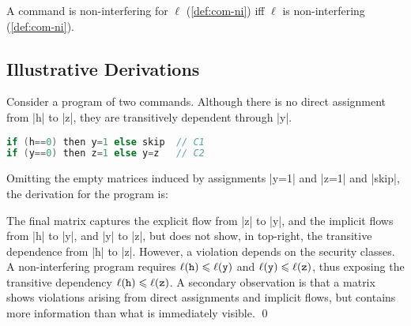 \begin{conjecture}[Correspondence]
A command %
is non-interfering for \(\ell\) (\autoref{def:com-ni})
iff \(\ell\) is non-interfering (\autoref{def:com-ni}).
\end{conjecture}


\subsection{Illustrative Derivations}
\label{plas-examples}

\begin{example}
Consider a program of two commands.
Although there is no direct assignment from \prc|h| to \prc|z|, they are transitively dependent through \prc|y|.

\begin{lstlisting}[language=C]
if (h==0) then y=1 else skip  // C1
if (y==0) then z=1 else y=z   // C2
\end{lstlisting}
Omitting the empty matrices induced by assignments \prc|y=1| and \prc|z=1| and \prc|skip|, the derivation for the program is:
\begin{center}\end{center}
The final matrix captures the explicit flow from \prc|z| to \prc|y|,
and the implicit flows from \prc|h| to \prc|y|, and \prc|y| to \prc|z|,
but does not show, in top-right, the transitive dependence from \prc|h| to \prc|z|.
However, a violation depends on the security classes.
A non-interfering program requires \(\ell(\mathtt{h}) \leqslant \ell(\mathtt{y})\) and \(\ell(\mathtt{y}) \leqslant \ell(\mathtt{z})\),
thus exposing the transitive dependency $\ell(\mathtt{h}) \leqslant \ell(\mathtt{z})$.
A secondary observation is that a matrix shows violations arising from direct assignments and implicit flows,
but contains more information than what is immediately visible.
\qed
\end{example}

